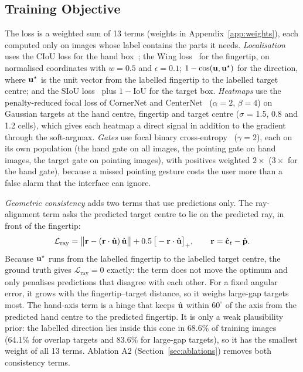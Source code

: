 \subsection{Training Objective}\label{sec:losses}
The loss is a weighted sum of 13 terms (weights in Appendix~\ref{app:weights}), each computed only on images whose label contains the parts it needs. \emph{Localisation} uses the CIoU loss for the hand box~\cite{zheng2020distance}; the Wing loss~\cite{feng2018wing} for the fingertip, on normalised coordinates with $w{=}0.5$ and $\epsilon{=}0.1$; $1-\cos(\mathbf{u},\mathbf{u}^\star)$ for the direction, where $\mathbf{u}^\star$ is the unit vector from the labelled fingertip to the labelled target centre; and the SIoU loss~\cite{gevorgyan2022siou} plus $1-\mathrm{IoU}$ for the target box. \emph{Heatmaps} use the penalty-reduced focal loss of CornerNet and CenterNet~\cite{law2018cornernet,zhou2019objects} ($\alpha{=}2$, $\beta{=}4$) on Gaussian targets at the hand centre, fingertip and target centre ($\sigma$ = 1.5, 0.8 and 1.2 cells), which gives each heatmap a direct signal in addition to the gradient through the soft-argmax. \emph{Gates} use focal binary cross-entropy~\cite{lin2017focal} ($\gamma{=}2$), each on its own population (the hand gate on all images, the pointing gate on hand images, the target gate on pointing images), with positives weighted $2\times$ ($3\times$ for the hand gate), because a missed pointing gesture costs the user more than a false alarm that the interface can ignore.

\emph{Geometric consistency} adds two terms that use predictions only. The ray-alignment term asks the predicted target centre to lie on the predicted ray, in front of the fingertip:
\begin{equation}
\mathcal{L}_{\mathrm{ray}} = \big\|\mathbf{r}-(\mathbf{r}\cdot\hat{\mathbf{u}})\,\hat{\mathbf{u}}\big\| + 0.5\,\big[-\mathbf{r}\cdot\hat{\mathbf{u}}\big]_+,\qquad \mathbf{r}=\hat{\mathbf{c}}_t-\hat{\mathbf{p}}.
\end{equation}
Because $\mathbf{u}^\star$ runs from the labelled fingertip to the labelled target centre, the ground truth gives $\mathcal{L}_{\mathrm{ray}}=0$ exactly: the term does not move the optimum and only penalises predictions that disagree with each other. For a fixed angular error, it grows with the fingertip--target distance, so it weighs large-gap targets most. The hand-axis term is a hinge that keeps $\hat{\mathbf{u}}$ within $60^\circ$ of the axis from the predicted hand centre to the predicted fingertip. It is only a weak plausibility prior: the labelled direction lies inside this cone in 68.6\% of training images (64.1\% for overlap targets and 83.6\% for large-gap targets), so it has the smallest weight of all 13 terms. Ablation A2 (Section~\ref{sec:ablations}) removes both consistency terms.

